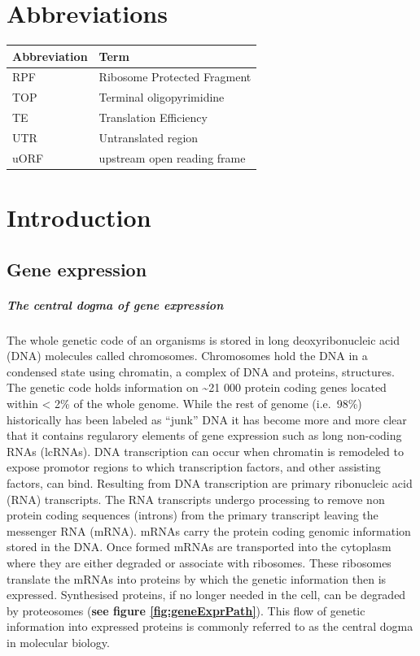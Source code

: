 \documentclass[12pt,openany]{book}
\author{}
\date{\vspace{-2.5em}}
\begin{document}
{
\setcounter{tocdepth}{3}
\tableofcontents
}
\cleardoublepage
\pagestyle{fancy} \fancyhf{} \renewcommand{\headrulewidth}{0pt}
\fancyfoot[LE,RO]{\thepage} \renewcommand{\floatpagefraction}{.9}
\setcounter{page}{9}

\chapter*{Abbreviations}\label{abbreviations}

\begin{tabular}{ll}
\toprule
Abbreviation & Term\\
\midrule
RPF & Ribosome Protected Fragment\\
TOP & Terminal oligopyrimidine\\
TE & Translation Efficiency\\
UTR & Untranslated region\\
uORF & upstream open reading frame\\
\bottomrule
\end{tabular}

\chapter{Introduction}

\section{Gene expression}\paragraph{The central dogma of gene expression}

The whole genetic code of an organisms is stored in long
deoxyribonucleic acid (DNA) molecules called chromosomes. Chromosomes
hold the DNA in a condensed state using chromatin, a complex of DNA and
proteins, structures. The genetic code holds information on
\textasciitilde{}21 000 protein coding genes located within \textless{}
2\% of the whole genome. While the rest of genome (i.e.~98\%)
historically has been labeled as ``junk'' DNA it has become more and
more clear that it contains regularory elements of gene expression such
as long non-coding RNAs (lcRNAs). DNA transcription can occur when
chromatin is remodeled to expose promotor regions to which transcription
factors, and other assisting factors, can bind. Resulting from DNA
transcription are primary ribonucleic acid (RNA) transcripts. The RNA
transcripts undergo processing to remove non protein coding sequences
(introns) from the primary transcript leaving the messenger RNA (mRNA).
mRNAs carry the protein coding genomic information stored in the DNA.
Once formed mRNAs are transported into the cytoplasm where they are
either degraded or associate with ribosomes. These ribosomes translate
the mRNAs into proteins by which the genetic information then is
expressed. Synthesised proteins, if no longer needed in the cell, can be
degraded by proteosomes (\textbf{see figure \ref{fig:geneExprPath}}).
This flow of genetic information into expressed proteins is commonly
referred to as the central dogma in molecular biology.
\end{document}

